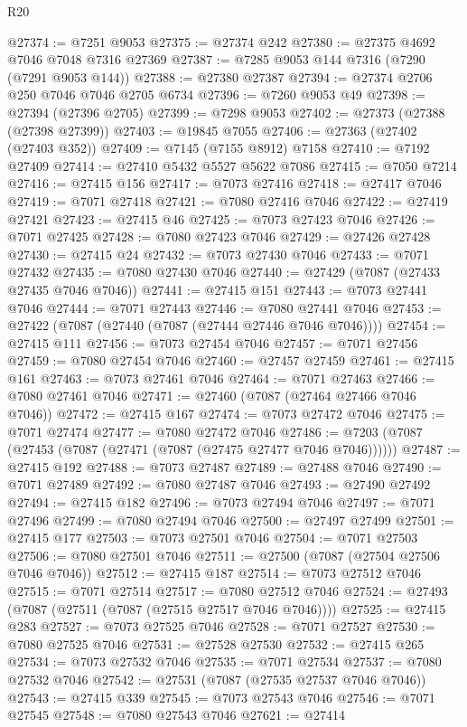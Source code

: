 \begin{lexlean}{R20}
\begin{coremodule}
{@27374 := @7251 @9053
@27375 := @27374 @242
@27380 := @27375 @4692 @7046 @7048 @7316 @27369
@27387 := @7285 @9053 @144 @7316 (@7290 (@7291 @9053 @144))
@27388 := @27380 @27387
@27394 := @27374 @2706 @250 @7046 @7046 @2705 @6734
@27396 := @7260 @9053 @49
@27398 := @27394 (@27396 @2705)
@27399 := @7298 @9053
@27402 := @27373 (@27388 (@27398 @27399))
@27403 := @19845 @7055
@27406 := @27363 (@27402 (@27403 @352))
@27409 := @7145 (@7155 @8912) @7158
@27410 := @7192 @27409
@27414 := @27410 @5432 @5527 @5622 @7086
@27415 := @7050 @7214
@27416 := @27415 @156
@27417 := @7073 @27416
@27418 := @27417 @7046
@27419 := @7071 @27418
@27421 := @7080 @27416 @7046
@27422 := @27419 @27421
@27423 := @27415 @46
@27425 := @7073 @27423 @7046
@27426 := @7071 @27425
@27428 := @7080 @27423 @7046
@27429 := @27426 @27428
@27430 := @27415 @24
@27432 := @7073 @27430 @7046
@27433 := @7071 @27432
@27435 := @7080 @27430 @7046
@27440 := @27429 (@7087 (@27433 @27435 @7046 @7046))
@27441 := @27415 @151
@27443 := @7073 @27441 @7046
@27444 := @7071 @27443
@27446 := @7080 @27441 @7046
@27453 := @27422 (@7087 (@27440 (@7087 (@27444 @27446 @7046 @7046))))
@27454 := @27415 @111
@27456 := @7073 @27454 @7046
@27457 := @7071 @27456
@27459 := @7080 @27454 @7046
@27460 := @27457 @27459
@27461 := @27415 @161
@27463 := @7073 @27461 @7046
@27464 := @7071 @27463
@27466 := @7080 @27461 @7046
@27471 := @27460 (@7087 (@27464 @27466 @7046 @7046))
@27472 := @27415 @167
@27474 := @7073 @27472 @7046
@27475 := @7071 @27474
@27477 := @7080 @27472 @7046
@27486 := @7203 (@7087 (@27453 (@7087 (@27471 (@7087 (@27475 @27477 @7046 @7046))))))
@27487 := @27415 @192
@27488 := @7073 @27487
@27489 := @27488 @7046
@27490 := @7071 @27489
@27492 := @7080 @27487 @7046
@27493 := @27490 @27492
@27494 := @27415 @182
@27496 := @7073 @27494 @7046
@27497 := @7071 @27496
@27499 := @7080 @27494 @7046
@27500 := @27497 @27499
@27501 := @27415 @177
@27503 := @7073 @27501 @7046
@27504 := @7071 @27503
@27506 := @7080 @27501 @7046
@27511 := @27500 (@7087 (@27504 @27506 @7046 @7046))
@27512 := @27415 @187
@27514 := @7073 @27512 @7046
@27515 := @7071 @27514
@27517 := @7080 @27512 @7046
@27524 := @27493 (@7087 (@27511 (@7087 (@27515 @27517 @7046 @7046))))
@27525 := @27415 @283
@27527 := @7073 @27525 @7046
@27528 := @7071 @27527
@27530 := @7080 @27525 @7046
@27531 := @27528 @27530
@27532 := @27415 @265
@27534 := @7073 @27532 @7046
@27535 := @7071 @27534
@27537 := @7080 @27532 @7046
@27542 := @27531 (@7087 (@27535 @27537 @7046 @7046))
@27543 := @27415 @339
@27545 := @7073 @27543 @7046
@27546 := @7071 @27545
@27548 := @7080 @27543 @7046
@27621 := @27414
}
\end{coremodule}
\end{lexlean}
